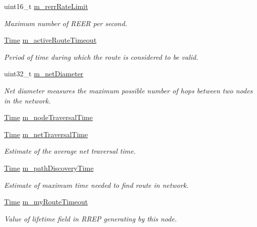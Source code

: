 \begin{DoxyCompactItemize}
uint16\+\_\+t \hyperlink{classns3_1_1aodv_1_1RoutingProtocol_ad7a69761e61bcea41a2bc87ad8928e2d}{m\+\_\+rerr\+Rate\+Limit}
\begin{DoxyCompactList}\small\item\em Maximum number of R\+E\+ER per second. \end{DoxyCompactList}\item 
\hyperlink{classns3_1_1Time}{Time} \hyperlink{classns3_1_1aodv_1_1RoutingProtocol_a37ec921ef1c48e4d8e7072fe989613d2}{m\+\_\+active\+Route\+Timeout}
\begin{DoxyCompactList}\small\item\em Period of time during which the route is considered to be valid. \end{DoxyCompactList}\item 
uint32\+\_\+t \hyperlink{classns3_1_1aodv_1_1RoutingProtocol_a563c2234b89a44628f8e71b38e7c60ec}{m\+\_\+net\+Diameter}
\begin{DoxyCompactList}\small\item\em Net diameter measures the maximum possible number of hops between two nodes in the network. \end{DoxyCompactList}\item 
\hyperlink{classns3_1_1Time}{Time} \hyperlink{classns3_1_1aodv_1_1RoutingProtocol_ad467863779ea1559ad5942ff6c24a706}{m\+\_\+node\+Traversal\+Time}
\item 
\hyperlink{classns3_1_1Time}{Time} \hyperlink{classns3_1_1aodv_1_1RoutingProtocol_a4642e67ba68a7ef40405f5773650ea1a}{m\+\_\+net\+Traversal\+Time}
\begin{DoxyCompactList}\small\item\em Estimate of the average net traversal time. \end{DoxyCompactList}\item 
\hyperlink{classns3_1_1Time}{Time} \hyperlink{classns3_1_1aodv_1_1RoutingProtocol_a491c2fe5559a8153343df590999b468f}{m\+\_\+path\+Discovery\+Time}
\begin{DoxyCompactList}\small\item\em Estimate of maximum time needed to find route in network. \end{DoxyCompactList}\item 
\hyperlink{classns3_1_1Time}{Time} \hyperlink{classns3_1_1aodv_1_1RoutingProtocol_a7681a59458486d0b7a61937a9a90b0a1}{m\+\_\+my\+Route\+Timeout}
\begin{DoxyCompactList}\small\item\em Value of lifetime field in R\+R\+EP generating by this node. \end{DoxyCompactList}\item 

\end{DoxyCompactItemize}
